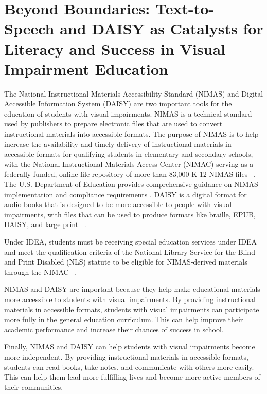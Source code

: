 \chapter{Beyond Boundaries: Text-to-Speech and DAISY as Catalysts for Literacy and Success in Visual Impairment Education}\label{ch7:chap:text-to-speech-daisy}
\raggedright
The National Instructional Materials Accessibility Standard (NIMAS) and Digital Accessible Information System (DAISY) are two important tools for the education of students with visual impairments. NIMAS is a technical standard used by publishers to prepare electronic files that are used to convert instructional materials into accessible formats. The purpose of NIMAS is to help increase the availability and timely delivery of instructional materials in accessible formats for qualifying students in elementary and secondary schools, with the National Instructional Materials Access Center (NIMAC) serving as a federally funded, online file repository of more than 83,000 K-12 NIMAS files~ \supercite{NIMAC2025}. The U.S. Department of Education provides comprehensive guidance on NIMAS implementation and compliance requirements \supercite{USDeptEducation2021}. DAISY is a digital format for audio books that is designed to be more accessible to people with visual impairments, with files that can be used to produce formats like braille, EPUB, DAISY, and large print~ \supercite{DAISY2024}.

Under IDEA, students must be receiving special education services under IDEA and meet the qualification criteria of the National Library Service for the Blind and Print Disabled (NLS) statute to be eligible for NIMAS-derived materials through the NIMAC~ \supercite{CTEducation2025}.

NIMAS and DAISY are important because they help make educational materials more accessible to students with visual impairments. By providing instructional materials in accessible formats, students with visual impairments can participate more fully in the general education curriculum. This can help improve their academic performance and increase their chances of success in school.

Finally, NIMAS and DAISY can help students with visual impairments become more independent. By providing instructional materials in accessible formats, students can read books, take notes, and communicate with others more easily. This can help them lead more fulfilling lives and become more active members of their communities.

